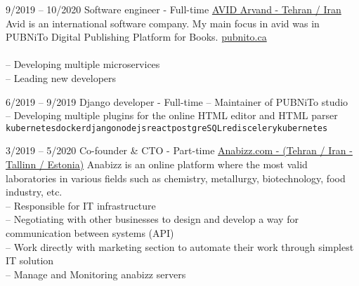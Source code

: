 \documentclass[9pt]{developercv}
\begin{document}
\begin{entrylist}
	\entry
	{9/2019 -- 10/2020}
	{Software engineer - Full-time}
	{
		\href{https://www.linkedin.com/company/avid-technology-development/}{AVID Arvand - Tehran / Iran}}
	{ Avid is an international software company. My main focus in avid was in PUBNiTo Digital Publishing Platform for Books.	 \href{https://pubnito.ca/}{pubnito.ca}\\ \\
		-- Developing multiple microservices \\
		-- Leading new developers }
\end{entrylist}
\begin{entrylist}
	\entry
	{6/2019 -- 9/2019}
	{Django developer - Full-time}
	{ }
	{-- Maintainer of PUBNiTo studio \\
		-- Developing multiple plugins for the online HTML editor and HTML parser  \\

		\texttt{kubernetes}\slashsep\texttt{docker}\slashsep\texttt{django}\slashsep\texttt{nodejs}\slashsep\texttt{react}\slashsep\texttt{postgreSQL}\slashsep\texttt{redis}\slashsep\texttt{celery}\slashsep\texttt{kubernetes}}
\end{entrylist}
\begin{entrylist}
	\entry
	{3/2019 -- 5/2020}
	{Co-founder \& CTO - Part-time}
	{\href{https://www.e-krediidiinfo.ee/16152752-ANABIZZ OÜ}{Anabizz.com - (Tehran / Iran - Tallinn / Estonia)}}
	{Anabizz is an online platform where the most valid laboratories in various fields such as chemistry, metallurgy, biotechnology, food industry, etc. \\
		-- Responsible for IT infrastructure  \\
		-- Negotiating with other businesses to design and develop a way for communication between systems (API) \\
		-- Work directly with marketing section to automate their work through simplest IT solution \\
		-- Manage and Monitoring anabizz servers \\
	}
\end{entrylist}
\end{document}
